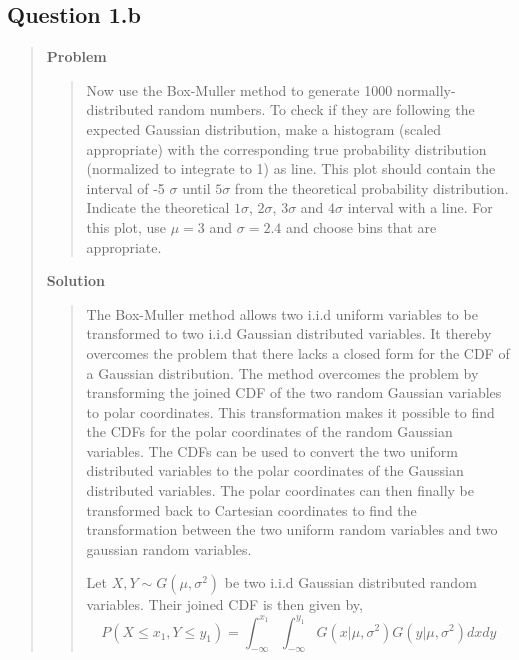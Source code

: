 
\subsection*{\textbf{Question 1.b}}
\begin{quote}

\textbf{Problem}
\begin{quote}Now use the Box-Muller method to generate 1000 normally-distributed random numbers. To check if they are following the expected Gaussian distribution, make a histogram (scaled appropriate) with the corresponding true probability distribution (normalized to integrate to 1) as line. This plot should contain the interval of -5 $\sigma$ until $5\sigma$ from the theoretical probability distribution. Indicate the theoretical $1\sigma$, $2\sigma$, $3\sigma$ and $4\sigma$ interval with a line. For this plot, use $\mu =3$ and $\sigma = 2.4$ and choose bins that are appropriate.
\end{quote}

\textbf{Solution} 



\begin{quote}
The Box-Muller method allows two i.i.d uniform variables to be transformed to two i.i.d Gaussian distributed variables. It thereby overcomes the problem that there lacks a closed form for the CDF of a Gaussian distribution. The method overcomes the problem by transforming the joined CDF of the two random Gaussian variables to polar coordinates. This transformation makes it possible to find the CDFs for the polar coordinates of the random Gaussian variables. The CDFs can be used to convert the two uniform distributed variables to the polar coordinates of the Gaussian distributed variables. The polar coordinates can then finally be transformed back to Cartesian coordinates to find the transformation between the two uniform random variables and two gaussian random variables.



Let $X, Y \sim G(\mu, \sigma ^2)$ be two i.i.d Gaussian distributed random variables. Their joined CDF is then given by, 
\begin{equation}
P(X \leq x_1, Y \leq y_1) =  \int_{-\infty}^{x_1} \int_{-\infty}^{y_1} G(x| \mu, \sigma^2) G(y| \mu, \sigma^2) dx dy
\end{equation}


\end{quote}
\end{quote}
